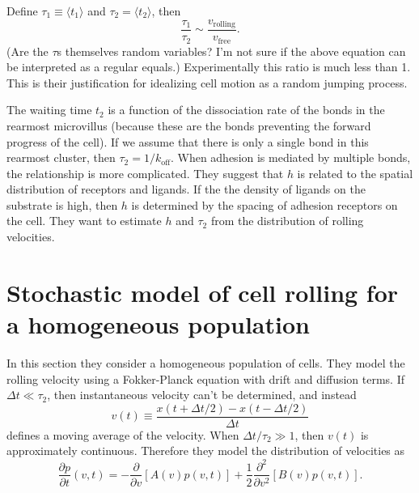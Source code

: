 \documentclass[
10pt, %
letterpaper, %
twocolumn, %
landscape %
]{article}
\begin{document}
Define $\tau_1 \equiv \langle t_1 \rangle$ and $\tau_2 = \langle t_2
\rangle$, then 
\begin{equation*}
  \frac{\tau_1}{\tau_2} \sim \frac{v_\text{rolling}}{v_\text{free}}.
\end{equation*}
(Are the $\tau$s themselves random variables? I'm not sure if the
above equation can be interpreted as a regular equals.) Experimentally
this ratio is much less than 1. This is their justification for
idealizing cell motion as a random jumping process. 

The waiting time $t_2$ is a function of the dissociation rate of the
bonds in the rearmost microvillus (because these are the bonds
preventing the forward progress of the cell). If we assume that there
is only a single bond in this rearmost cluster, then $\tau_2 =
1/k_\text{off}$. When adhesion is mediated by multiple bonds, the
relationship is more complicated. They suggest that $h$ is related to
the spatial distribution of receptors and ligands. If the the density
of ligands on the substrate is high, then $h$ is determined by the
spacing of adhesion receptors on the cell. They want to estimate $h$
and $\tau_2$ from the distribution of rolling velocities. 


\section{Stochastic model of cell rolling for a homogeneous
  population}

In this section they consider a homogeneous population of cells. They
model the rolling velocity using a Fokker-Planck equation with drift
and diffusion terms. If $\Delta t \ll \tau_2$, then instantaneous
velocity can't be determined, and instead 
\begin{equation}
  \label{eq:velocity}
  v(t) \equiv \frac{x(t + \Delta t/2) - x(t - \Delta t/2)}{\Delta t}
\end{equation}
defines a moving average of the velocity. When $\Delta t/\tau_2 \gg
1$, then $v(t)$ is approximately continuous. Therefore they model the
distribution of velocities as 
\begin{equation*}
  \frac{\partial p}{\partial t}(v, t) = -\frac{\partial}{\partial
    v}[A(v)p(v,t)] + \frac{1}{2}\frac{\partial^2}{\partial
    v^2}[B(v)p(v,t)].
\end{equation*}
\end{document}
